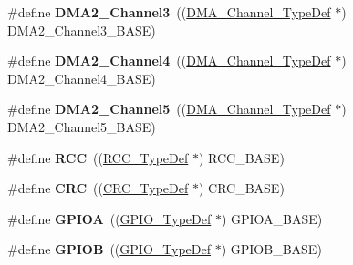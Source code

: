 \begin{DoxyCompactItemize}
\item 
\hypertarget{group___peripheral__declaration_ga6dca52a79587e0ca9a5d669048b4c7eb}{\#define {\bfseries D\-M\-A2\-\_\-\-Channel3}~((\hyperlink{struct_d_m_a___channel___type_def}{D\-M\-A\-\_\-\-Channel\-\_\-\-Type\-Def} $\ast$) D\-M\-A2\-\_\-\-Channel3\-\_\-\-B\-A\-S\-E)}\label{group___peripheral__declaration_ga6dca52a79587e0ca9a5d669048b4c7eb}

\item 
\hypertarget{group___peripheral__declaration_ga612b396657695191ad740b0b59bc9f12}{\#define {\bfseries D\-M\-A2\-\_\-\-Channel4}~((\hyperlink{struct_d_m_a___channel___type_def}{D\-M\-A\-\_\-\-Channel\-\_\-\-Type\-Def} $\ast$) D\-M\-A2\-\_\-\-Channel4\-\_\-\-B\-A\-S\-E)}\label{group___peripheral__declaration_ga612b396657695191ad740b0b59bc9f12}

\item 
\hypertarget{group___peripheral__declaration_ga521c13b7d0f82a6897d47995da392750}{\#define {\bfseries D\-M\-A2\-\_\-\-Channel5}~((\hyperlink{struct_d_m_a___channel___type_def}{D\-M\-A\-\_\-\-Channel\-\_\-\-Type\-Def} $\ast$) D\-M\-A2\-\_\-\-Channel5\-\_\-\-B\-A\-S\-E)}\label{group___peripheral__declaration_ga521c13b7d0f82a6897d47995da392750}

\item 
\hypertarget{group___peripheral__declaration_ga74944438a086975793d26ae48d5882d4}{\#define {\bfseries R\-C\-C}~((\hyperlink{struct_r_c_c___type_def}{R\-C\-C\-\_\-\-Type\-Def} $\ast$) R\-C\-C\-\_\-\-B\-A\-S\-E)}\label{group___peripheral__declaration_ga74944438a086975793d26ae48d5882d4}

\item 
\hypertarget{group___peripheral__declaration_ga4381bb54c2dbc34500521165aa7b89b1}{\#define {\bfseries C\-R\-C}~((\hyperlink{struct_c_r_c___type_def}{C\-R\-C\-\_\-\-Type\-Def} $\ast$) C\-R\-C\-\_\-\-B\-A\-S\-E)}\label{group___peripheral__declaration_ga4381bb54c2dbc34500521165aa7b89b1}

\item 
\hypertarget{group___peripheral__declaration_gac485358099728ddae050db37924dd6b7}{\#define {\bfseries G\-P\-I\-O\-A}~((\hyperlink{struct_g_p_i_o___type_def}{G\-P\-I\-O\-\_\-\-Type\-Def} $\ast$) G\-P\-I\-O\-A\-\_\-\-B\-A\-S\-E)}\label{group___peripheral__declaration_gac485358099728ddae050db37924dd6b7}

\item 
\hypertarget{group___peripheral__declaration_ga68b66ac73be4c836db878a42e1fea3cd}{\#define {\bfseries G\-P\-I\-O\-B}~((\hyperlink{struct_g_p_i_o___type_def}{G\-P\-I\-O\-\_\-\-Type\-Def} $\ast$) G\-P\-I\-O\-B\-\_\-\-B\-A\-S\-E)}\label{group___peripheral__declaration_ga68b66ac73be4c836db878a42e1fea3cd}


\end{DoxyCompactItemize}
